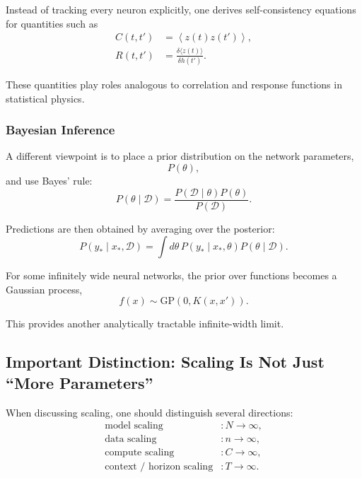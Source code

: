 Instead of tracking every neuron explicitly, one derives self-consistency
equations for quantities such as
\begin{align}
    C(t,t')
    &=
    \left\langle
    z(t)z(t')
    \right\rangle,
    \\
    R(t,t')
    &=
    \frac{\delta \langle z(t)\rangle}
    {\delta h(t')}.
\end{align}

These quantities play roles analogous to correlation and response functions in
statistical physics.


\subsubsection{Bayesian Inference}

A different viewpoint is to place a prior distribution on the network
parameters,
\begin{equation}
    P(\theta),
\end{equation}
and use Bayes' rule:
\begin{equation}
    P(\theta\mid\mathcal D)
    =
    \frac{
        P(\mathcal D\mid\theta)P(\theta)
    }{
        P(\mathcal D)
    }.
\end{equation}

Predictions are then obtained by averaging over the posterior:
\begin{equation}
    P(y_\ast\mid x_\ast,\mathcal D)
    =
    \int
    d\theta\,
    P(y_\ast\mid x_\ast,\theta)
    P(\theta\mid\mathcal D).
\end{equation}

For some infinitely wide neural networks, the prior over functions becomes a
Gaussian process,
\begin{equation}
    f(x)\sim\mathrm{GP}(0,K(x,x')).
\end{equation}

This provides another analytically tractable infinite-width limit.


\subsection{Important Distinction: Scaling Is Not Just ``More Parameters''}

When discussing scaling, one should distinguish several directions:
\begin{align}
    \text{model scaling}
    &: N\rightarrow\infty,
    \\
    \text{data scaling}
    &: n\rightarrow\infty,
    \\
    \text{compute scaling}
    &: C\rightarrow\infty,
    \\
    \text{context / horizon scaling}
    &: T\rightarrow\infty.
\end{align}

